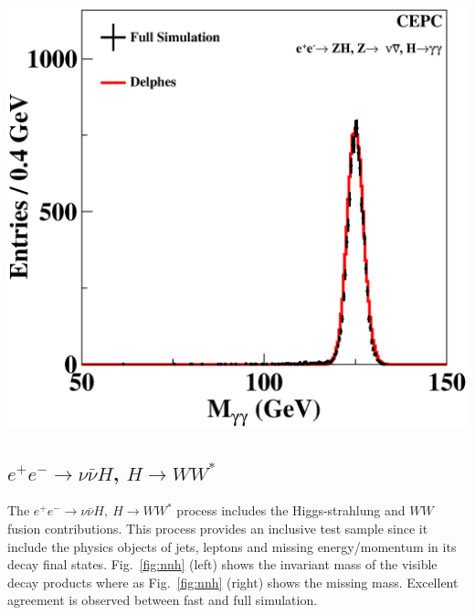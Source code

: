\documentclass[a4paper,10pt,twoside]{cpc-hepnp}
\begin{document}
\begin{multicols}{2}
\begin{center}
\includegraphics[width=0.8\linewidth]{figs/gg_h}
\end{center}

\subsection{$e^+e^-\to \nu\bar{\nu}H$, $H \to WW^*$}

The $e^+e^- \to \nu\bar{\nu}H,~H\to WW^*$ process includes the Higgs-strahlung and $WW$ fusion contributions.
This process provides an inclusive test sample since it include the physics objects of jets, leptons and missing energy/momentum in its decay final states. 
Fig.~\ref{fig:nnh} (left) shows the invariant mass of the visible decay products where as Fig.~\ref{fig:nnh} (right) shows the missing mass. 
Excellent agreement is observed between fast and full simulation. 


\end{multicols}
\end{document}
